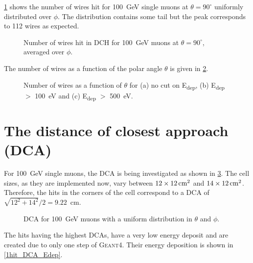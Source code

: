 \documentclass{article}
\begin{document}
\cref{numwires} shows the number of wires hit for 100~GeV single muons at $\theta=90^{\circ}$ uniformly distributed over $\phi$. The distribution contains some tail but the peak corresponds to 112 wires as expected.

\begin{figure}[!t]
\hfil
{}
\caption{Number of wires hit in DCH for 100~GeV muons at $\theta=90^{\circ}$, averaged over $\phi$.}
\label{numwires}
\end{figure}

The number of wires as a function of the polar angle $\theta$ is given in \cref{wires_vs_theta}.

\begin{figure}[!t]
\centering
{}
\hfil
{}
\hfil
{}
\caption{Number of wires as a function of $\theta$ for (a) no cut on E\textsubscript{dep}, (b) E\textsubscript{dep} $>$ 100~eV and (c) E\textsubscript{dep} $>$ 500~eV.}
\label{wires_vs_theta}
\end{figure}

\section{The distance of closest approach (DCA)}
For 100~GeV single muons, the DCA is being investigated as shown in \cref{DCA_noCut}. The cell sizes, as they are implemented now, vary between $12\times12\,\text{cm}^{2}$ and $14\times12\,\text{cm}^{2}$. Therefore, the hits in the corners of the cell correspond to a DCA of $\sqrt{12^2+14^2}/2=9.22$~cm.

\begin{figure}[h]
\centering
{}
\hfil
{}
\caption{DCA for 100~GeV muons with a uniform distribution in $\theta$ and $\phi$.}
\label{DCA_noCut}
\end{figure}

The hits having the highest DCAs, have a very low energy deposit and are created due to only one step of \textsc{Geant4}. Their energy deposition is shown in \cref{1hit_DCA_Edep}.
\end{document}
